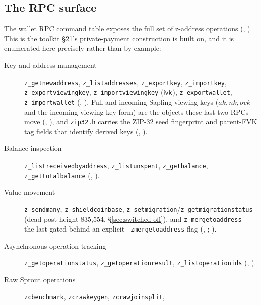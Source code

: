\subsection{The RPC surface}
\label{sec:rpc-surface}

The wallet RPC command table exposes the full set of z-address operations
(\shipped, ). This is the toolkit \S21's
private-payment construction is built on, and it is enumerated here precisely rather than by example:

\begin{description}
\item[Key and address management] \texttt{z\_getnewaddress}, \texttt{z\_listaddresses},
  \texttt{z\_exportkey}, \texttt{z\_importkey}, \texttt{z\_exportviewingkey},
  \texttt{z\_importviewingkey} ($\mathsf{ivk}$), \texttt{z\_exportwallet}, \texttt{z\_importwallet}
  (\shipped, ). Full and incoming Sapling viewing
  keys ($ak,nk,ovk$ and the incoming-viewing-key form) are the objects these last two RPCs move
  (\shipped, ), and \texttt{zip32.h} carries the
  ZIP-32 seed fingerprint and parent-FVK tag fields that identify derived keys (\shipped,
  ).
\item[Balance inspection] \texttt{z\_listreceivedbyaddress}, \texttt{z\_listunspent},
  \texttt{z\_getbalance}, \texttt{z\_gettotalbalance} (\shipped,
  ).
\item[Value movement] \texttt{z\_sendmany}, \texttt{z\_shieldcoinbase},
  \texttt{z\_setmigration}\slash\texttt{z\_getmigrationstatus} (dead post-height-835{,}554, \S\ref{sec:switched-off}),
  and \texttt{z\_mergetoaddress} — the last gated behind an explicit \texttt{-\allowbreak{}zmergetoaddress} flag
  (\shipped, ; ).
\item[Asynchronous operation tracking] \texttt{z\_getoperationstatus}, \texttt{z\_getoperationresult},
  \texttt{z\_listoperationids} (\shipped, ).
\item[Raw Sprout operations] \texttt{zcbenchmark}, \texttt{zcrawkeygen}, \texttt{zcrawjoinsplit},

\end{description}

